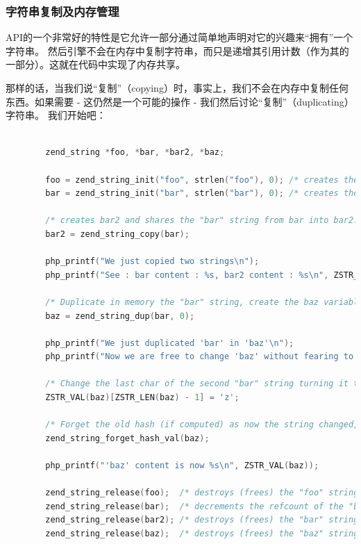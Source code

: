 \subsubsection{字符串复制及内存管理}

 API的一个非常好的特性是它允许一部分通过简单地声明对它的兴趣来“拥有”一个字符串。 然后引擎不会在内存中复制字符串，而只是递增其引用计数（作为其的一部分）。这就在代码中实现了内存共享。

那样的话，当我们说“复制”（copying）时，事实上，我们不会在内存中复制任何东西。如果需要 - 这仍然是一个可能的操作 - 我们然后讨论“复制”（duplicating）字符串。 我们开始吧：

\begin{lstlisting}[language=c]

        zend_string *foo, *bar, *bar2, *baz;

        foo = zend_string_init("foo", strlen("foo"), 0); /* creates the "foo" string in foo */
        bar = zend_string_init("bar", strlen("bar"), 0); /* creates the "bar" string in bar */

        /* creates bar2 and shares the "bar" string from bar into bar2. Also increments the refcount of the "bar" string to 2 */
        bar2 = zend_string_copy(bar);

        php_printf("We just copied two strings\n");
        php_printf("See : bar content : %s, bar2 content : %s\n", ZSTR_VAL(bar), ZSTR_VAL(bar2));

        /* Duplicate in memory the "bar" string, create the baz variable and make it solo owner of the newly created "bar" string */
        baz = zend_string_dup(bar, 0);

        php_printf("We just duplicated 'bar' in 'baz'\n");
        php_printf("Now we are free to change 'baz' without fearing to change 'bar'\n");

        /* Change the last char of the second "bar" string turning it to "baz" */
        ZSTR_VAL(baz)[ZSTR_LEN(baz) - 1] = 'z';

        /* Forget the old hash (if computed) as now the string changed, thus its hash must also change and get recomputed */
        zend_string_forget_hash_val(baz);

        php_printf("'baz' content is now %s\n", ZSTR_VAL(baz));

        zend_string_release(foo);  /* destroys (frees) the "foo" string */
        zend_string_release(bar);  /* decrements the refcount of the "bar" string to one */
        zend_string_release(bar2); /* destroys (frees) the "bar" string both in bar and bar2 vars */
        zend_string_release(baz);  /* destroys (frees) the "baz" string */
        
\end{lstlisting}    

